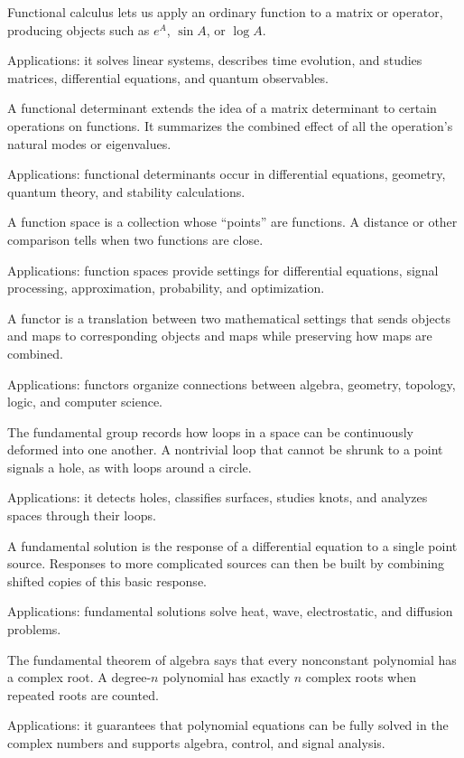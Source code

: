Functional calculus lets us apply an ordinary function to a matrix or operator, producing objects such as $e^A$, $\sin A$, or $\log A$. \par\noindent Applications: it solves linear systems, describes time evolution, and studies matrices, differential equations, and quantum observables.

A functional determinant extends the idea of a matrix determinant to certain operations on functions. It summarizes the combined effect of all the operation's natural modes or eigenvalues. \par\noindent Applications: functional determinants occur in differential equations, geometry, quantum theory, and stability calculations.

A function space is a collection whose “points” are functions. A distance or other comparison tells when two functions are close. \par\noindent Applications: function spaces provide settings for differential equations, signal processing, approximation, probability, and optimization.

A functor is a translation between two mathematical settings that sends objects and maps to corresponding objects and maps while preserving how maps are combined. \par\noindent Applications: functors organize connections between algebra, geometry, topology, logic, and computer science.

The fundamental group records how loops in a space can be continuously deformed into one another. A nontrivial loop that cannot be shrunk to a point signals a hole, as with loops around a circle. \par\noindent Applications: it detects holes, classifies surfaces, studies knots, and analyzes spaces through their loops.

A fundamental solution is the response of a differential equation to a single point source. Responses to more complicated sources can then be built by combining shifted copies of this basic response. \par\noindent Applications: fundamental solutions solve heat, wave, electrostatic, and diffusion problems.

The fundamental theorem of algebra says that every nonconstant polynomial has a complex root. A degree-$n$ polynomial has exactly $n$ complex roots when repeated roots are counted. \par\noindent Applications: it guarantees that polynomial equations can be fully solved in the complex numbers and supports algebra, control, and signal analysis.

